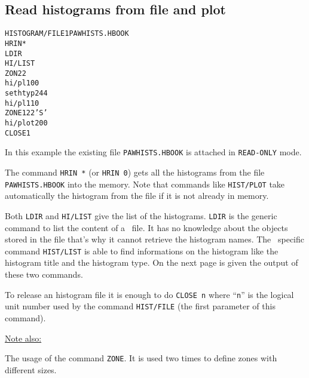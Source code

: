 \subsection{Read histograms from file and plot}
\begin{alltt}
     HISTOGRAM/FILE 1 PAWHISTS.HBOOK
     HRIN  *
     LDIR
     HI/LIST
     ZON 2 2
      hi/pl 100
      set htyp 244
      hi/pl 110
     ZONE 1 2 2 'S'
      hi/plot 200
     CLOSE 1
\end{alltt} 
\begin{DinglistE}
\item In this example the existing file {\tt PAWHISTS.HBOOK} is
      attached in {\tt READ-ONLY} mode.
\item The command {\tt HRIN *} (or {\tt HRIN 0}) gets all the
      histograms from the file {\tt PAWHISTS.HBOOK} into the memory. Note
      that commands like {\tt HIST/PLOT} take automatically the histogram
      from the file if it is not already in memory.
\item Both {\tt LDIR} and {\tt HI/LIST} give the list of the histograms.
      {\tt LDIR} is the generic command to list the content of a \ZEBRA\
      file. It has no knowledge about the objects stored in the
      file that's why it cannot retrieve the histogram names. 
      The \HBOOK\ specific command {\tt HIST/LIST} is able to find
      informations on the histogram like the histogram title and the
      histogram type.
      On the next page is given the output of these two commands.
\item To release an histogram file it is enough to do {\tt CLOSE n}
      where ``{\tt n}'' is the logical unit number used by the command
      {\tt HIST/FILE} (the first parameter of this command).

\underline{Note also:}

\item The usage of the command {\tt ZONE}. It is used two times
      to define zones with different sizes.
\end{DinglistE}
\clearpage
